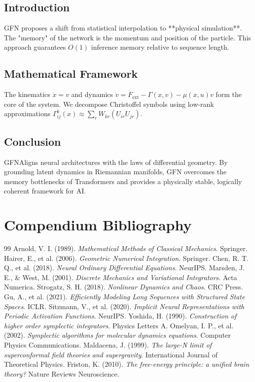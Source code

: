 \documentclass[11pt,a4paper]{report}
\begin{document}
\section{Introduction}
GFN proposes a shift from statistical interpolation to **physical simulation**. The "memory" of the network is the momentum and position of the particle. This approach guarantees $O(1)$ inference memory relative to sequence length.

\section{Mathematical Framework}
The kinematics $\dot{x} = v$ and dynamics $\dot{v} = F_{\text{ext}} - \Gamma(x, v) - \mu(x, u) v$ form the core of the system. We decompose Christoffel symbols using low-rank approximations $\Gamma^k_{ij}(x) \approx \sum_{r} W_{kr} (U_{ir} U_{jr})$.

\section{Conclusion}
GFNAligns neural architectures with the laws of differential geometry. By grounding latent dynamics in Riemannian manifolds, GFN overcomes the memory bottlenecks of Transformers and provides a physically stable, logically coherent framework for AI.

\chapter{Compendium Bibliography}
\begin{thebibliography}{99}
 Arnold, V. I. (1989). \textit{Mathematical Methods of Classical Mechanics}. Springer.
 Hairer, E., et al. (2006). \textit{Geometric Numerical Integration}. Springer.
 Chen, R. T. Q., et al. (2018). \textit{Neural Ordinary Differential Equations}. NeurIPS.
 Marsden, J. E., \& West, M. (2001). \textit{Discrete Mechanics and Variational Integrators}. Acta Numerica.
 Strogatz, S. H. (2018). \textit{Nonlinear Dynamics and Chaos}. CRC Press.
 Gu, A., et al. (2021). \textit{Efficiently Modeling Long Sequences with Structured State Spaces}. ICLR.
 Sitzmann, V., et al. (2020). \textit{Implicit Neural Representations with Periodic Activation Functions}. NeurIPS.
 Yoshida, H. (1990). \textit{Construction of higher order symplectic integrators}. Physics Letters A.
 Omelyan, I. P., et al. (2002). \textit{Symplectic algorithms for molecular dynamics equations}. Computer Physics Communications.
 Maldacena, J. (1999). \textit{The large-N limit of superconformal field theories and supergravity}. International Journal of Theoretical Physics.
 Friston, K. (2010). \textit{The free-energy principle: a unified brain theory?} Nature Reviews Neuroscience.
\end{thebibliography}
\end{document}
